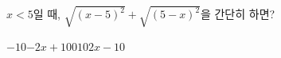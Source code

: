 $x<5$일 때, $\sqrt{(x-5)^2}+\sqrt{(5-x)^2}$을 간단히 하면?
\begin{choices32}{$-10$}{$-2x+10$}{$0$}{$10$}{$2x-10$}\end{choices32}
